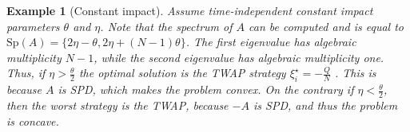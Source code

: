\documentclass[final,3p,authoryear,12pt]{elsarticle}
\newtheorem{example}{Example}
\begin{document}
\begin{example}[Constant impact]
\label{example:constant_impact}
Assume time-independent constant impact parameters $\theta$ and $\eta$.
Note that the spectrum of \(A\) can be computed and is equal to \(\mathrm{Sp}(A) = \{2\eta-\theta,2\eta+(N-1)\theta\}\). The first eigenvalue has algebraic multiplicity $N-1$, %
while the second eigenvalue has algebraic multiplicity one. Thus, if $\eta > \frac{\theta}{2}$ the optimal solution is the TWAP strategy $\xi^{\star}_{{i}}=-\frac{Q}{N}$ \cite{almgren2001optimal}. This is because $A$ is SPD, which makes the problem convex. On the contrary if $\eta < \frac{\theta}{2}$, then the worst strategy is the TWAP, because $-A$ is SPD, and thus the problem is concave.
\end{example}
\end{document}

